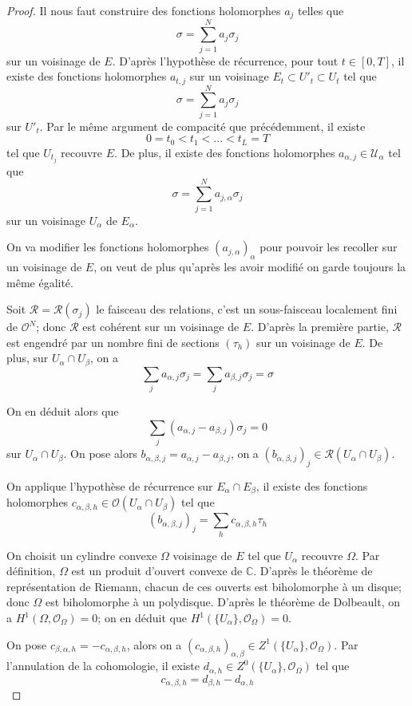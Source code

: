 \documentclass{article}
\theoremstyle{definition}
\theoremstyle{remark}
\begin{document}
\begin{proof}
Il nous faut construire des fonctions holomorphes $a_j$ telles que 
$$\sigma = \sum_{j=1}^N a_j\sigma_j$$ sur un voisinage de $E$. D'après l'hypothèse de récurrence, pour tout $t \in [0, T]$, il existe des fonctions holomorphes $a_{t,j}$ sur un voisinage $E_t \subset U'_t \subset U_t$ tel que
$$\sigma = \sum_{j=1}^N a_j\sigma_j$$
sur $U'_t$. Par le même argument de compacité que précédemment, il existe $$0 = t_0 < t_1 < ... < t_L = T$$ tel que ${U_{t_j}}$ recouvre $E$. De plus, il existe des fonctions holomorphes $a_{\alpha,j} \in \mathcal{U_\alpha}$ tel que $$\sigma = \sum_{j=1}^N a_{j, \alpha}\sigma_j$$ sur un voisinage $U_\alpha$ de $E_\alpha$.

On va modifier les fonctions holomorphes $(a_{j, \alpha})_\alpha$ pour pouvoir les recoller sur un voisinage de $E$, on veut de plus qu'après les avoir modifié on garde toujours la même égalité.

Soit $\mathcal{R} = \mathcal{R}(\sigma_j)$ le faisceau des relations, c'est un sous-faisceau localement fini de $\mathcal{O}^N$; donc $\mathcal{R}$ est cohérent sur un voisinage de $E$. D'après la première partie, $\mathcal{R}$ est engendré par un nombre fini de sections $(\tau_h)$ sur un voisinage de $E$. De plus, sur $U_\alpha \cap U_\beta$, on a $$\sum_j a_{\alpha,j}\sigma_j =\sum_j a_{\beta,j}\sigma_j = \sigma$$

On en déduit alors que
$$\sum_j (a_{\alpha,j} - a_{\beta,j})\sigma_j = 0$$ sur $U_\alpha \cap U_\beta$. On pose alors $b_{\alpha, \beta, j} = a_{\alpha,j} - a_{\beta,j}$, on a $(b_{\alpha, \beta, j})_j \in \mathcal{R}(U_\alpha \cap U_\beta)$.

On applique l'hypothèse de récurrence sur $E_\alpha \cap E_\beta$, il existe des fonctions holomorphes $c_{\alpha,\beta,h} \in \mathcal{O}(U_\alpha \cap U_\beta)$ tel que
$$(b_{\alpha,\beta,j})_j = \sum_h c_{\alpha,\beta,h}\tau_h$$

On choisit un cylindre convexe $\Omega$ voisinage de $E$ tel que ${U_\alpha}$ recouvre $\Omega$. Par définition, $\Omega$ est un produit d'ouvert convexe de $\mathbb{C}$. D'après le théorème de représentation de Riemann, chacun de ces ouverts est biholomorphe à un disque; donc $\Omega$ est biholomorphe à un polydisque. D'après le théorème de Dolbeault, on a $H^1(\Omega, \mathcal{O}_\Omega)=0$; on en déduit que $H^1(\{U_\alpha\}, \mathcal{O}_\Omega)=0$.

On pose $c_{\beta, \alpha, h} = - c_{\alpha, \beta, h}$, alors on a $(c_{\alpha,\beta,h})_{\alpha,\beta} \in Z^1(\{U_\alpha\}, \mathcal{O}_\Omega)$. Par l'annulation de la cohomologie, il existe $d_{\alpha, h} \in Z^0(\{U_\alpha\}, \mathcal{O}_\Omega)$ tel que $$c_{\alpha, \beta, h} = d_{\beta, h} - d_{\alpha, h}$$


\end{proof}
\end{document}
